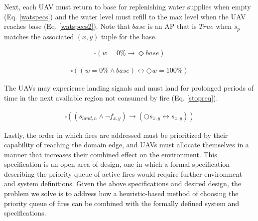 \documentclass{ieeeaccess}
\newcommand{\always}{\square}
\newcommand{\eventually}{\Diamond}
\newcommand{\next}{\bigcirc}
\begin{document}
Next, each UAV must return to base for replenishing water supplies when empty (Eq. \ref{watspecs}) and the water level must refill to the max level when the UAV reaches base (Eq. \ref{watspecs2}). Note that $base$ is an AP that is $True$ when $s_p$ matches the associated $(x,y)$ tuple for the base.

\begin{equation}
\begin{aligned}
\always (w = 0\% \longrightarrow \eventually base) 
\end{aligned}
\label{watspecs}
\end{equation}

\begin{equation}
\begin{aligned}
\always ((w = 0\% \land base) \leftrightarrow \next w = 100\%)
\end{aligned}
\label{watspecs2}
\end{equation}

The UAVs may experience landing signals and must land for prolonged periods of time in the next available region not consumed by fire (Eq. \ref{stopreq}). 

\begin{equation}
\begin{aligned}
\always ((s_{land,n} \land \lnot f_{x,y}) \longrightarrow (\next s_{x,y} \leftrightarrow s_{x,y}))
\end{aligned}
\label{stopreq}
\end{equation}

Lastly, the order in which fires are addressed must be prioritized by their capability of reaching the domain edge, and UAVs must allocate themselves in a manner that increases their combined effect on the environment. This specification is an open area of design, one in which a formal specification describing the priority queue of active fires would require further environment and system definitions. Given the above specifications and desired design, the problem we solve is to address how a heuristic-based method of choosing the priority queue of fires can be combined with the formally defined system and specifications.
\end{document}
